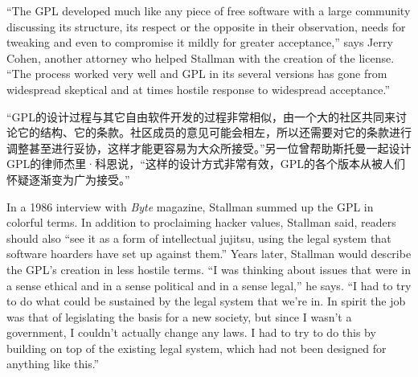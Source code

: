 \ifdefined\eng
``The GPL developed much like any piece of free software with a large community discussing its structure, its respect or the opposite in their observation, needs for tweaking and even to compromise it mildly for greater acceptance,'' says Jerry Cohen, another attorney who helped Stallman with the creation of the license. ``The process worked very well and GPL in its several versions has gone from widespread skeptical and at times hostile response to widespread acceptance.''
\fi

\ifdefined\chs
``GPL的设计过程与其它自由软件开发的过程非常相似，由一个大的社区共同来讨论它的结构、它的条款。社区成员的意见可能会相左，所以还需要对它的条款进行调整甚至进行妥协，这样才能更容易为大众所接受。''另一位曾帮助斯托曼一起设计GPL的律师杰里·科恩说，``这样的设计方式非常有效，GPL的各个版本从被人们怀疑逐渐变为广为接受。''
\fi

\ifdefined\eng
In a 1986 interview with \textit{Byte} magazine, Stallman summed up the GPL in colorful terms. In addition to proclaiming hacker values, Stallman said, readers should also ``see it as a form of intellectual jujitsu, using the legal system that software hoarders have set up against them.'' Years later, Stallman would describe the GPL's creation in less hostile terms. ``I was thinking about issues that were in a sense ethical and in a sense political and in a sense legal,'' he says. ``I had to try to do what could be sustained by the legal system that we're in. In spirit the job was that of legislating the basis for a new society, but since I wasn't a government, I couldn't actually change any laws. I had to try to do this by building on top of the existing legal system, which had not been designed for anything like this.''
\fi

